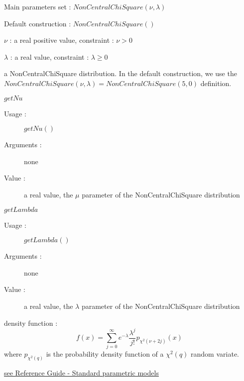 \begin{description}

\item[Usage :] \rule{0pt}{1em}
  \begin{description}
  \item Main parameters set : $NonCentralChiSquare(\nu, \lambda)$
  \item Default construction : $NonCentralChiSquare( )$
  \end{description}

\item[Arguments :]  \rule{0pt}{1em}
  \begin{description}
  \item $\nu$ :  a real positive value,  constraint : $\nu > 0$
  \item $\lambda$ :  a real value, constraint : $\lambda \geq 0$
  \end{description}

\item[Value :] a NonCentralChiSquare distribution. In the default construction, we use the $NonCentralChiSquare(\nu, \lambda) = NonCentralChiSquare(5, 0)$ definition.

\item[Some methods :] \rule{0pt}{1em}
  \begin{description}

  \item $getNu$
    \begin{description}
    \item[Usage :] $getNu()$
    \item[Arguments :] none
    \item[Value :]  a real value,  the $\mu$ parameter of the NonCentralChiSquare distribution
    \end{description}
    \bigskip

  \item $getLambda$
    \begin{description}
    \item[Usage :] $getLambda()$
    \item[Arguments :] none
    \item[Value :]  a real value,  the $\lambda$ parameter of the NonCentralChiSquare distribution
    \end{description}
    \bigskip
  \end{description}

\item[Details :]  \rule{0pt}{1em}
  \begin{description}
  \item density function :
    $$
    f(x) = \displaystyle \sum_{j=0}^{\infty} e^{-\lambda}\frac{\lambda^j}{j!}p_{\chi^2(\nu+2j)}(x)
    $$
    where $p_{\chi^2(q)}$ is the probability density function of a $\chi^2(q)$ random variate.
  \end{description}

\item[Links :]  \rule{0pt}{1em}
  \href{OpenTURNS_ReferenceGuide.pdf}{see Reference Guide - Standard parametric models}
\end{description}


